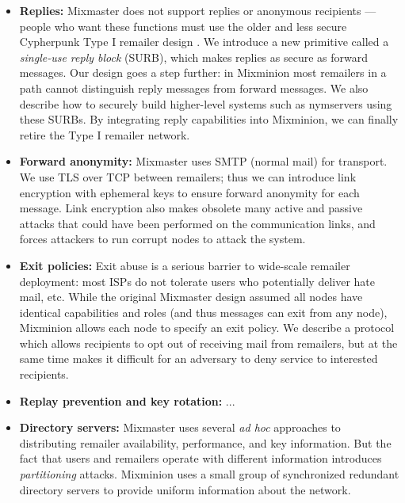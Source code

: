 \documentclass[11pt]{IEEEtran}
\begin{document}
\begin{itemize}
\item \textbf{Replies:} Mixmaster does not support replies or anonymous
recipients --- people who want these functions must use the older and
less secure Cypherpunk Type I remailer design \cite{remailer-history}. We
introduce a new primitive called a \emph{single-use reply block} (SURB),
which makes replies as secure as forward messages. Our design goes a
step further: in Mixminion most remailers in a path cannot distinguish
reply messages from forward messages. We also describe how to securely
build higher-level systems such as nymservers using these SURBs. By
integrating reply capabilities into Mixminion, we can finally retire
the Type I remailer network.

\item \textbf{Forward anonymity:} Mixmaster uses SMTP (normal mail) for
transport. We use TLS over TCP between remailers; thus we can introduce
link encryption with ephemeral keys to ensure forward anonymity for
each message. Link encryption also makes obsolete many active and
passive attacks that could have been performed on the communication
links, and forces attackers to run corrupt nodes to attack the
system. 


\item \textbf{Exit policies:} Exit abuse is a serious barrier to wide-scale
remailer deployment: most ISPs do not tolerate users who potentially
deliver hate mail, etc. While the original Mixmaster design assumed all
nodes have identical capabilities and roles (and thus messages can exit
from any node), Mixminion allows each node to specify an exit policy. We
describe a protocol which allows recipients to opt out of receiving mail
from remailers, but at the same time makes it difficult for an adversary
to deny service to interested recipients.

\item \textbf{Replay prevention and key rotation:} ...

\item \textbf{Directory servers:} Mixmaster uses several \emph{ad hoc}
approaches to distributing remailer availability, performance, and
key information. But the fact that users and remailers operate with
different information introduces \emph{partitioning} attacks. Mixminion
uses a small group of synchronized redundant directory servers
to provide uniform information about the network.


\end{itemize}
\end{document}

